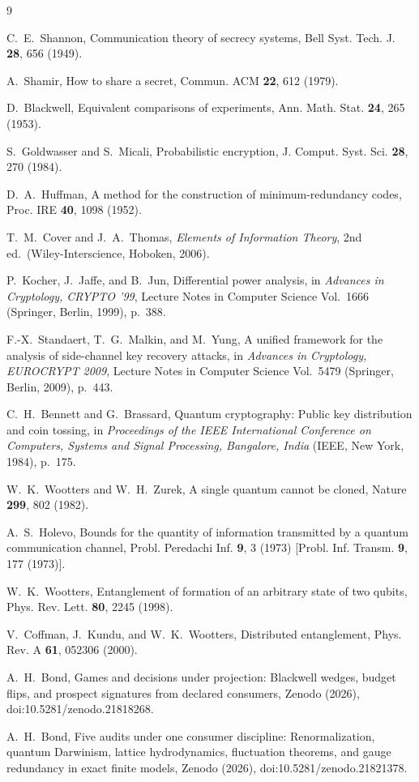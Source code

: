 \documentclass[aps,pre,reprint,nofootinbib]{revtex4-2}
\begin{document}
\begin{thebibliography}{9}

C.~E.~Shannon,
Communication theory of secrecy systems,
Bell Syst. Tech. J. \textbf{28}, 656 (1949).

A.~Shamir,
How to share a secret,
Commun. ACM \textbf{22}, 612 (1979).

D.~Blackwell,
Equivalent comparisons of experiments,
Ann. Math. Stat. \textbf{24}, 265 (1953).

S.~Goldwasser and S.~Micali,
Probabilistic encryption,
J. Comput. Syst. Sci. \textbf{28}, 270 (1984).

D.~A.~Huffman,
A method for the construction of minimum-redundancy codes,
Proc. IRE \textbf{40}, 1098 (1952).

T.~M.~Cover and J.~A.~Thomas,
\emph{Elements of Information Theory}, 2nd ed.\
(Wiley-Interscience, Hoboken, 2006).

P.~Kocher, J.~Jaffe, and B.~Jun,
Differential power analysis,
in \emph{Advances in Cryptology, CRYPTO '99},
Lecture Notes in Computer Science Vol.~1666
(Springer, Berlin, 1999), p.~388.

F.-X.~Standaert, T.~G.~Malkin, and M.~Yung,
A unified framework for the analysis of side-channel key recovery
attacks,
in \emph{Advances in Cryptology, EUROCRYPT 2009},
Lecture Notes in Computer Science Vol.~5479
(Springer, Berlin, 2009), p.~443.

C.~H.~Bennett and G.~Brassard,
Quantum cryptography: Public key distribution and coin tossing,
in \emph{Proceedings of the IEEE International Conference on
Computers, Systems and Signal Processing, Bangalore, India}
(IEEE, New York, 1984), p.~175.

W.~K.~Wootters and W.~H.~Zurek,
A single quantum cannot be cloned,
Nature \textbf{299}, 802 (1982).

A.~S.~Holevo,
Bounds for the quantity of information transmitted by a quantum
communication channel,
Probl. Peredachi Inf. \textbf{9}, 3 (1973)
[Probl. Inf. Transm. \textbf{9}, 177 (1973)].

W.~K.~Wootters,
Entanglement of formation of an arbitrary state of two qubits,
Phys. Rev. Lett. \textbf{80}, 2245 (1998).

V.~Coffman, J.~Kundu, and W.~K.~Wootters,
Distributed entanglement,
Phys. Rev. A \textbf{61}, 052306 (2000).

A.~H.~Bond,
Games and decisions under projection: Blackwell wedges, budget
flips, and prospect signatures from declared consumers,
Zenodo (2026), doi:10.5281/zenodo.21818268.

A.~H.~Bond,
Five audits under one consumer discipline: Renormalization, quantum
Darwinism, lattice hydrodynamics, fluctuation theorems, and gauge
redundancy in exact finite models,
Zenodo (2026), doi:10.5281/zenodo.21821378.

\end{thebibliography}
\end{document}
